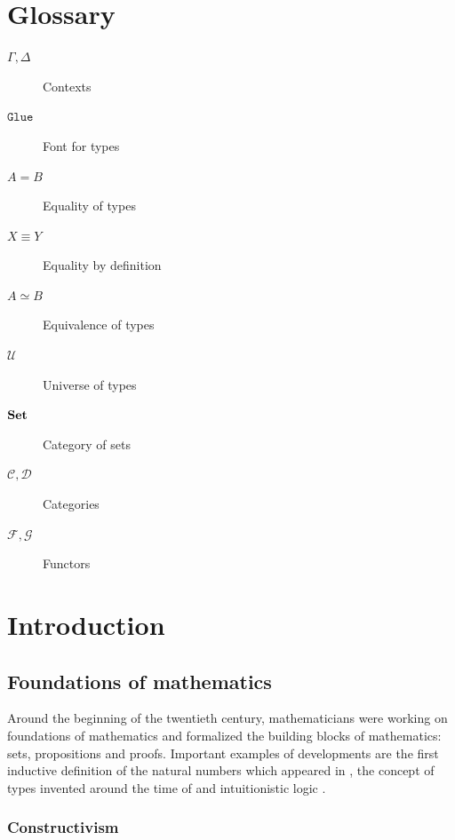 \documentclass[11pt,a4paper,twoside,xetex,draft]{book}
\newcommand{\op}[1]{\mathtt{#1}}
\begin{document}
\chapter*{Glossary}


\begin{description}
\item[$\Gamma, \Delta$] Contexts
\item[$\op{Glue}$] Font for types
\item[$A = B$] Equality of types
\item[$X \equiv Y$] Equality by definition
\item[$A \simeq B$] Equivalence of types
\item[$\mathcal{U}$] Universe of types
\item[$\text{\textbf{Set}}$] Category of sets
\item[$\mathcal{C}, \mathcal{D}$] Categories
\item[$\mathcal{F}, \mathcal{G}$] Functors
\end{description}

\listoftodos[Notes]

\newpage

\tableofcontents


\newpage
\setcounter{page}{0}




\chapter{Introduction}

\section{Foundations of mathematics}\label{types}

Around the beginning of the twentieth century, mathematicians were working on foundations of mathematics and formalized the building blocks of mathematics: sets, propositions and proofs. Important examples of developments are the first inductive definition of the natural numbers which appeared in \cite{Peano1879}, the concept of types invented around the time of \cite{Russel1903} and intuitionistic logic \cite{Heyting1930}. 

\subsection{Constructivism}
\end{document}
